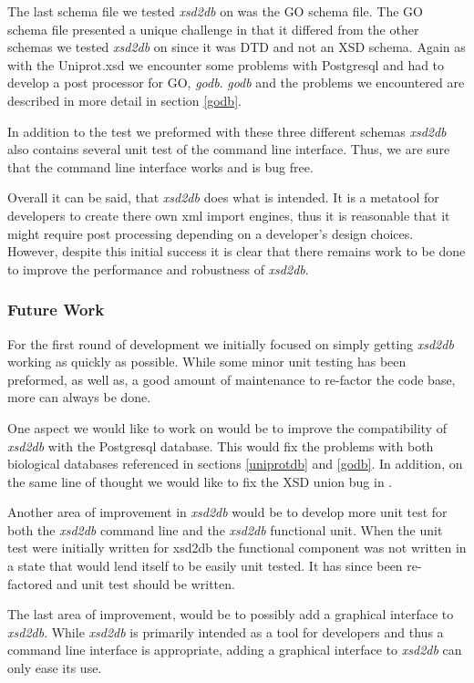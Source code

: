 The last schema file we tested \emph{xsd2db} on was the GO schema file.  The GO schema file presented a unique challenge in that it differed from the other schemas we tested \emph{xsd2db} on since it was DTD and not an XSD schema.  Again as with the Uniprot.xsd we encounter some problems with Postgresql and had to develop a post processor for GO, \emph{godb}.  \emph{godb} and the problems we encountered are described in more detail in section \ref{godb}.

In addition to the test we preformed with these three different schemas \emph{xsd2db} also contains several unit test of the command line interface.  Thus, we are sure that the command line interface works and is bug free.

Overall it can be said, that \emph{xsd2db} does what is intended.  It is a metatool for developers to create there own xml import engines, thus it is reasonable that it might require post processing depending on a developer's design choices.  However, despite this initial success it is clear that there remains work to be done to improve the performance and robustness of \emph{xsd2db}. 

\subsubsection{Future Work}
For the first round of development we initially focused on simply getting \emph{xsd2db} working as quickly as possible.  While some minor unit testing has been preformed, as well as, a good amount of maintenance to re-factor the code base, more can always be done.  

One aspect we would like to work on would be to improve the compatibility of \emph{xsd2db} with the Postgresql database.  This would fix  the problems with both biological databases referenced in sections \ref{uniprotdb} and \ref{godb}.  In addition, on the same line of thought we would like to fix the XSD union bug in .

Another area of improvement in \emph{xsd2db} would be to develop more unit test for both the \emph{xsd2db} command line and the \emph{xsd2db} functional unit.  When the unit test were initially written for xsd2db the functional component was not written in a state that would lend itself to be easily unit tested.  It has since been re-factored and unit test should be written.

The last area of improvement, would be to possibly add a graphical interface to \emph{xsd2db}.  While \emph{xsd2db} is primarily intended as a tool for developers and thus a command line interface is appropriate, adding a graphical interface to \emph{xsd2db} can only ease its use.



